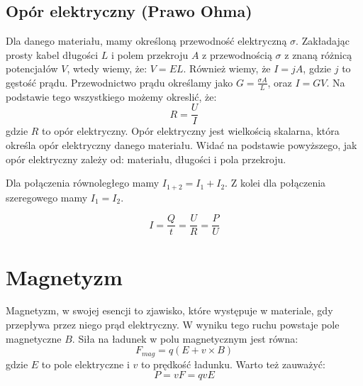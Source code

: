 \documentclass{../notatki}
\begin{document}
\subsection{Opór elektryczny (Prawo Ohma)}

Dla danego materiału, mamy określoną przewodność elektryczną $\sigma$.
Zakładając prosty kabel długości $L$ i polem przekroju $A$ z przewodnością
$\sigma$ z znaną różnicą potencjałów $V$, wtedy wiemy, że: $V = EL$. Również
wiemy, że $I = jA$, gdzie $j$ to gęstość prądu. Przewodnictwo prądu określamy
jako $G = \frac{\sigma A}{L}$, oraz $I = GV$. Na podstawie tego wszystkiego
możemy okreslić, że:
$$
R = \frac{U}{I}
$$
gdzie $R$ to opór elektryczny. Opór
elektryczny jest wielkością skalarna, która określa opór elektryczny danego
materiału. Widać na podstawie powyższego, jak opór elektryczny zależy od:
materiału, długości i pola przekroju.

\begin{figure*}[h]
  \centering
\end{figure*}
Dla połączenia równoległego mamy $I_{1+2} = I_1 + I_2$. Z kolei dla
połączenia szeregowego mamy $I_1 = I_2$.

$$
I = \frac{Q}{t} = \frac{U}{R} = \frac{P}{U}
$$

\section{Magnetyzm}

Magnetyzm, w swojej esencji to zjawisko, które występuje w materiale, gdy
przepływa przez niego prąd elektryczny. W wyniku tego ruchu powstaje pole
magnetyczne $B$. Siła na ładunek w polu magnetycznym jest równa:
$$
F_{mag} =q(E + v \times B)
$$
gdzie $E$ to pole elektryczne i $v$ to prędkość ładunku.
Warto też zauważyć:
$$
P = vF = qvE
$$
\end{document}

